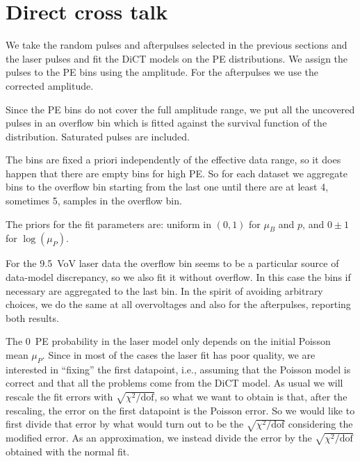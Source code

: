 \begin{figure}
    
    
    
\end{figure}

\section{Direct cross talk}

We take the random pulses and afterpulses selected in the previous sections and
the laser pulses and fit the DiCT models on the PE distributions. We assign the
pulses to the PE bins using the amplitude. For the afterpulses we use the
corrected amplitude.

Since the PE bins do not cover the full amplitude range, we put all the
uncovered pulses in an overflow bin which is fitted against the survival
function of the distribution. Saturated pulses are included.

The bins are fixed a priori independently of the effective data range, so it
does happen that there are empty bins for high PE. So for each dataset we
aggregate bins to the overflow bin starting from the last one until there are
at least 4, sometimes 5, samples in the overflow bin.

The priors for the fit parameters are: uniform in $(0,1)$ for $\mu_B$ and $p$,
and $0 \pm 1$ for $\log(\mu_P)$.

For the \SI{9.5}{VoV} laser data the overflow bin seems to be a particular
source of data-model discrepancy, so we also fit it without overflow. In this
case the bins if necessary are aggregated to the last bin. In the spirit of
avoiding arbitrary choices, we do the same at all overvoltages and also for the
afterpulses, reporting both results.

The 0~PE probability in the laser model only depends on the initial Poisson
mean $\mu_P$. Since in most of the cases the laser fit has poor quality, we are
interested in ``fixing'' the first datapoint, i.e., assuming that the Poisson
model is correct and that all the problems come from the DiCT model. As usual
we will rescale the fit errors with $\sqrt{\chi^2/\mathrm{dof}}$, so what we
want to obtain is that, after the rescaling, the error on the first datapoint
is the Poisson error. So we would like to first divide that error by what would
turn out to be the $\sqrt{\chi^2/\mathrm{dof}}$ considering the modified error.
As an approximation, we instead divide the error by the
$\sqrt{\chi^2/\mathrm{dof}}$ obtained with the normal fit.

